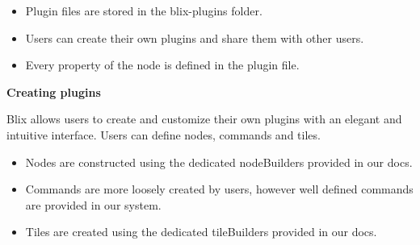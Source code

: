 \documentclass[11pt,a4paper]{article}
\begin{document}
\begin{itemize}
  \item[\textbullet] Plugin files are stored in the blix-plugins folder.
  \item[\textbullet] Users can create their own plugins and share them with other users.
  \item[\textbullet] Every property of the node is defined in the plugin file.
\end{itemize}

\textbf{Creating plugins}

Blix allows users to create and customize their own plugins with an elegant and intuitive interface. Users can define nodes, commands and tiles.

\begin{itemize}
  \item[\textbullet] Nodes are constructed using the dedicated nodeBuilders provided in our docs.
  \item[\textbullet] Commands are more loosely created by users, however well defined commands are provided in our system.
  \item[\textbullet] Tiles are created using the dedicated tileBuilders provided in our docs.
\end{itemize}
\end{document}
